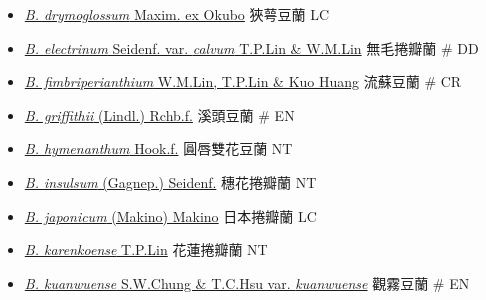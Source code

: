 \begin{itemize}
\begin{itemize}
        \item[] \href{http://www.theplantlist.org/tpl1.1/search?q=Bulbophyllum+drymoglossum}{\textit{B. drymoglossum} Maxim. ex Okubo}   狹萼豆蘭   LC
        \item[] \href{http://www.theplantlist.org/tpl1.1/search?q=Bulbophyllum+electrinum+var.+calvum}{\textit{B. electrinum} Seidenf. var. \textit{calvum} T.P.Lin \& W.M.Lin}   無毛捲瓣蘭  \# DD
        \item[] \href{http://www.theplantlist.org/tpl1.1/search?q=Bulbophyllum+fimbriperianthium}{\textit{B. fimbriperianthium} W.M.Lin, T.P.Lin \& Kuo Huang}   流蘇豆蘭  \# CR
        \item[] \href{http://www.theplantlist.org/tpl1.1/search?q=Bulbophyllum+griffithii}{\textit{B. griffithii} (Lindl.) Rchb.f.}   溪頭豆蘭  \# EN
        \item[] \href{http://www.theplantlist.org/tpl1.1/search?q=Bulbophyllum+hymenanthum}{\textit{B. hymenanthum} Hook.f.}   圓唇雙花豆蘭   NT
        \item[] \href{http://www.theplantlist.org/tpl1.1/search?q=Bulbophyllum+insulsum}{\textit{B. insulsum} (Gagnep.) Seidenf.}   穗花捲瓣蘭   NT
        \item[] \href{http://www.theplantlist.org/tpl1.1/search?q=Bulbophyllum+japonicum}{\textit{B. japonicum} (Makino) Makino}   日本捲瓣蘭   LC
        \item[] \href{http://www.theplantlist.org/tpl1.1/search?q=Bulbophyllum+karenkoense}{\textit{B. karenkoense} T.P.Lin}   花蓮捲瓣蘭   NT
        \item[] \href{http://www.theplantlist.org/tpl1.1/search?q=Bulbophyllum+kuanwuense+var.+kuanwuense}{\textit{B. kuanwuense} S.W.Chung \& T.C.Hsu var. \textit{kuanwuense}}   觀霧豆蘭  \# EN

\end{itemize}
\end{itemize}

